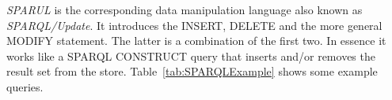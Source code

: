 \emph{SPARUL}\cite{SPARQLUpdate} is the corresponding data manipulation
language also known as \emph{SPARQL/Update}. It introduces the INSERT, DELETE
and the more general MODIFY statement. The latter is a combination of the
first two. In essence it works like a
SPARQL CONSTRUCT query that inserts and/or removes the result set from the
store. Table~\ref{tab:SPARQLExample} shows some example queries.


%

